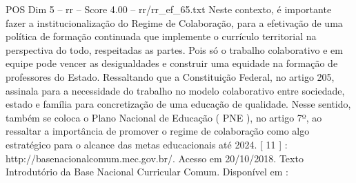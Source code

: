 \begin{textsample}{POS Dim 5 – rr – Score 4.00 – rr/rr\_ef\_65.txt}
Neste contexto, é importante fazer a institucionalização do Regime de Colaboração, para a efetivação de uma política de formação continuada que implemente o currículo territorial na perspectiva do todo, respeitadas as partes.
Pois só o trabalho colaborativo e em equipe pode vencer as desigualdades e construir uma equidade na formação de professores do Estado.
Ressaltando que a Constituição Federal, no artigo 205, assinala para a necessidade do trabalho no modelo colaborativo entre sociedade, estado e família para concretização de uma educação de qualidade.
Nesse sentido, também se coloca o Plano Nacional de Educação ( PNE ), no artigo 7º, ao ressaltar a importância de promover o regime de colaboração como algo estratégico para o alcance das metas educacionais até 2024. [ 11 ] : http://basenacionalcomum.mec.gov.br/.
Acesso em 20/10/2018.
Texto Introdutório da Base Nacional Curricular Comum.
Disponível em :

\end{textsample}
